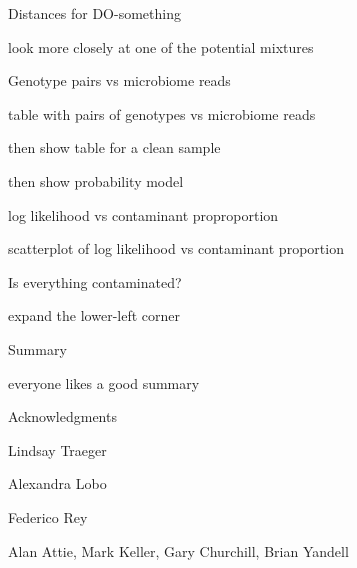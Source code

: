 \documentclass[aspectratio=169,12pt,t]{beamer}
\begin{document}
\begin{frame}[c]{Distances for DO-something}

\bbi
 \item look more closely at one of the potential mixtures
\ei

\note{}

\end{frame}




\begin{frame}[c]{Genotype pairs vs microbiome reads}

\bbi
 \item table with pairs of genotypes vs microbiome reads
 \item then show table for a clean sample
 \item then show probability model
\ei

\note{}

\end{frame}



\begin{frame}[c]{log likelihood vs contaminant proproportion}

\bbi
 \item scatterplot of log likelihood vs contaminant proportion
\ei

\note{}

\end{frame}



\begin{frame}[c]{Is everything contaminated?}

\bbi
 \item expand the lower-left corner
\ei

\note{}

\end{frame}




\begin{frame}[c]{Summary}

\bbi
 \item everyone likes a good summary
\ei

\note{}

\end{frame}




\begin{frame}[c]{Acknowledgments}

\bbi
 \item Lindsay Traeger
 \item Alexandra Lobo
 \item Federico Rey
 \item Alan Attie, Mark Keller, Gary Churchill, Brian Yandell
\ei

\note{}

\end{frame}
\end{document}
